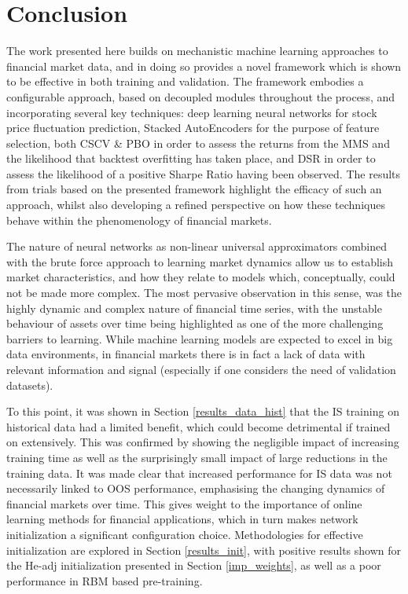 \documentclass[a4paper,11pt,oneside]{article}
\theoremstyle{plain}
\theoremstyle{definition}
\begin{document}
	
	
	\newpage
	\section{Conclusion}\label{Conclusion}
	
	The work presented here builds on mechanistic machine learning approaches to financial market data, and in doing so provides a novel framework which is shown to be effective in both training and validation. The framework embodies a configurable approach, based on decoupled modules throughout the process, and incorporating several key techniques: deep learning neural networks for stock price fluctuation prediction, Stacked AutoEncoders for the purpose of feature selection, both CSCV \& PBO in order to assess the returns from the MMS and the likelihood that backtest overfitting has taken place, and DSR in order to assess the likelihood of a positive Sharpe Ratio having been observed. The results from trials based on the presented framework highlight the efficacy of such an approach, whilst also developing a refined perspective on how these techniques behave within the phenomenology of financial markets.\newline 
	
	The nature of neural networks as non-linear universal approximators combined with the brute force approach to learning market dynamics allow us to establish market characteristics, and how they relate to models which, conceptually, could not be made more complex. The most pervasive observation in this sense, was the highly dynamic and complex nature of financial time series, with the unstable behaviour of assets over time being highlighted as one of the more challenging barriers to learning. While machine learning models are expected to excel in big data environments, in financial markets there is in fact a lack of data with relevant information and signal (especially if one considers the need of validation datasets). \newline
	
	To this point, it was shown in Section \ref{results_data_hist} that the IS training on historical data had a limited benefit, which could become detrimental if trained on extensively. This was confirmed by showing the negligible impact of increasing training time as well as the surprisingly small impact of large reductions in the training data. It was made clear that increased performance for IS data was not necessarily linked to OOS performance, emphasising the changing dynamics of financial markets over time. This gives weight to the importance of online learning methods for financial applications, which in turn makes network initialization a significant configuration choice. Methodologies for effective initialization are explored in Section \ref{results_init}, with positive results shown for the He-adj initialization presented in Section \ref{imp_weights}, as well as a poor performance in RBM based pre-training.  \newline
	
\end{document}
